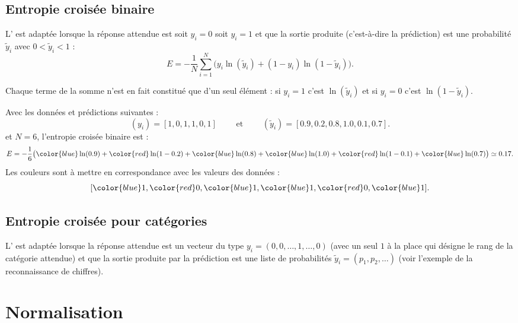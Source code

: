 \documentclass[11pt,class=report,crop=false]{standalone}
\begin{document}
    
\subsection{Entropie croisée binaire}

L' est adaptée lorsque la réponse attendue est soit $y_i=0$ soit $y_i=1$ et que la sortie produite (c'est-à-dire la prédiction) est une probabilité $\widetilde y_i$ avec $0 < \widetilde y_i < 1$ :
$$E = -\frac{1}{N} \sum_{i=1}^N \big( y_i \ln(\widetilde y_i) + (1-y_i) \ln(1-\widetilde y_i)\big).$$
  
Chaque terme de la somme n'est en fait constitué que d'un seul élément : si
$y_i=1$ c'est  $\ln(\widetilde y_i)$ et si $y_i=0$ c'est $\ln(1-\widetilde y_i)$.

  
\begin{exemple}
Avec les données et prédictions suivantes :
$$(y_i) =  [1,0,1,1,0,1]
\qquad \text{ et } \qquad
(\widetilde y_i) = [0.9,0.2,0.8,1.0,0.1,0.7].
$$
et $N=6$, l'entropie croisée binaire est : 
$$E = -\frac{1}{6} \big( 
{\color{blue}\ln(0.9)} + {\color{red}\ln(1-0.2)} + {\color{blue}\ln(0.8)} + 
{\color{blue}\ln(1.0)} + {\color{red}\ln(1-0.1)} + {\color{blue}\ln(0.7)}
\big) \simeq 0.17.$$
Les couleurs sont à mettre en correspondance avec les valeurs des données :
$$[{\color{blue}1},{\color{red}0},{\color{blue}1},{\color{blue}1},{\color{red}0},{\color{blue}1}].$$
\end{exemple} 
    
    
\subsection{Entropie croisée pour catégories}

L' est adaptée lorsque la réponse attendue est un vecteur du type $y_i=(0,0,\ldots,1,\ldots,0)$ (avec un seul $1$ à la place qui désigne le rang de la catégorie attendue) et que la sortie produite par la prédiction est une liste de probabilités $\widetilde y_i = (p_1,p_2,\ldots)$ (voir l'exemple de la reconnaissance de chiffres).
 
 
 
\section{Normalisation}
\end{document}
